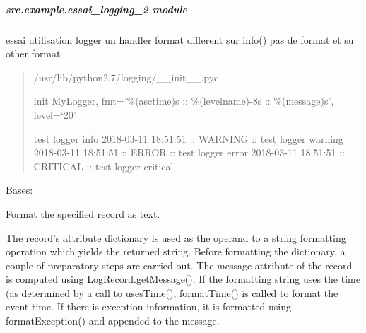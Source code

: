 \documentclass[a4paper,10pt,english]{sphinxmanual}
\begin{document}
\subparagraph{src.example.essai\_logging\_2 module}
\label{\detokenize{apidoc_src/src.example:module-src.example.essai_logging_2}}\label{\detokenize{apidoc_src/src.example:src-example-essai-logging-2-module}}

essai utilisation logger un handler format different 
sur info() pas de format et su other format
\begin{quote}

/usr/lib/python2.7/logging/\_\_init\_\_.pyc

init MyLogger, fmt=’\%(asctime)s :: \%(levelname)-8s :: \%(message)s’, level=‘20’

test logger info
2018-03-11 18:51:51 :: WARNING  :: test logger warning
2018-03-11 18:51:51 :: ERROR    :: test logger error
2018-03-11 18:51:51 :: CRITICAL :: test logger critical
\end{quote}

\begin{fulllineitems}
\label{\detokenize{apidoc_src/src.example:src.example.essai_logging_2.MyFormatter}}
Bases: 

\begin{fulllineitems}
\label{\detokenize{apidoc_src/src.example:src.example.essai_logging_2.MyFormatter.format}}
Format the specified record as text.

The record’s attribute dictionary is used as the operand to a
string formatting operation which yields the returned string.
Before formatting the dictionary, a couple of preparatory steps
are carried out. The message attribute of the record is computed
using LogRecord.getMessage(). If the formatting string uses the
time (as determined by a call to usesTime(), formatTime() is
called to format the event time. If there is exception information,
it is formatted using formatException() and appended to the message.

\end{fulllineitems}


\end{fulllineitems}
\end{document}
